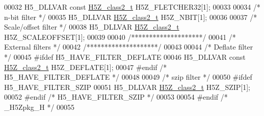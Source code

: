\begin{DoxyCode}
00032 H5\_DLLVAR \textcolor{keyword}{const} \hyperlink{struct_h5_z__class2__t}{H5Z\_class2\_t} H5Z\_FLETCHER32[1];
00033 
00034 \textcolor{comment}{/* n-bit filter */}
00035 H5\_DLLVAR \hyperlink{struct_h5_z__class2__t}{H5Z\_class2\_t} H5Z\_NBIT[1];
00036 
00037 \textcolor{comment}{/* Scale/offset filter */}
00038 H5\_DLLVAR \hyperlink{struct_h5_z__class2__t}{H5Z\_class2\_t} H5Z\_SCALEOFFSET[1];
00039 
00040 \textcolor{comment}{/********************/}
00041 \textcolor{comment}{/* External filters */}
00042 \textcolor{comment}{/********************/}
00043 
00044 \textcolor{comment}{/* Deflate filter */}
00045 \textcolor{preprocessor}{#ifdef H5\_HAVE\_FILTER\_DEFLATE}
00046 H5\_DLLVAR \textcolor{keyword}{const} \hyperlink{struct_h5_z__class2__t}{H5Z\_class2\_t} H5Z\_DEFLATE[1];
00047 \textcolor{preprocessor}{#endif }\textcolor{comment}{/* H5\_HAVE\_FILTER\_DEFLATE */}\textcolor{preprocessor}{}
00048 
00049 \textcolor{comment}{/* szip filter */}
00050 \textcolor{preprocessor}{#ifdef H5\_HAVE\_FILTER\_SZIP}
00051 H5\_DLLVAR \hyperlink{struct_h5_z__class2__t}{H5Z\_class2\_t} H5Z\_SZIP[1];
00052 \textcolor{preprocessor}{#endif }\textcolor{comment}{/* H5\_HAVE\_FILTER\_SZIP */}\textcolor{preprocessor}{}
00053 
00054 \textcolor{preprocessor}{#endif }\textcolor{comment}{/* \_H5Zpkg\_H */}\textcolor{preprocessor}{}
00055 
\end{DoxyCode}
